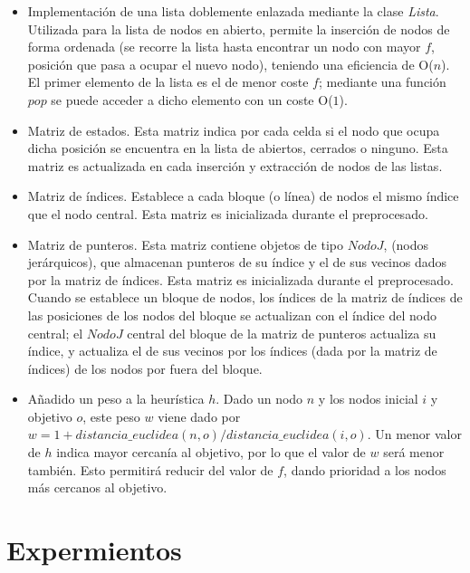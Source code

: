 \documentclass[11pt,spanish]{article} %
\begin{document}
\begin{itemize}
	\item Implementación de una lista doblemente enlazada mediante la clase \textit{Lista}. Utilizada para la lista de nodos en abierto, permite la inserción de nodos de forma ordenada (se recorre la lista hasta encontrar un nodo con mayor $f$, posición que pasa a ocupar el nuevo nodo), teniendo una eficiencia de O($n$). El primer elemento de la lista es el de menor coste $f$; mediante una función $pop$ se puede acceder a dicho elemento con un coste O($1$).
	
	\item Matriz de estados. Esta matriz indica por cada celda si el nodo que ocupa dicha posición se encuentra en la lista de abiertos, cerrados o ninguno. Esta matriz es actualizada en cada inserción y extracción de nodos de las listas.
	
	\item Matriz de índices. Establece a cada bloque (o línea) de nodos el mismo índice que el nodo central.	Esta matriz es inicializada durante el preprocesado.
	
	\item Matriz de punteros. Esta matriz contiene objetos de tipo $NodoJ$, (nodos jerárquicos), que almacenan punteros de su índice y el de sus vecinos dados por la matriz de índices. Esta matriz es inicializada durante el preprocesado. Cuando se establece un bloque de nodos, los índices de la matriz de índices de las posiciones de los nodos del bloque se actualizan con el índice del nodo central; el $NodoJ$ central del bloque de la matriz de punteros actualiza su índice, y actualiza el de sus vecinos por los índices (dada por la matriz de índices) de los nodos por fuera del bloque.

	\item Añadido un peso a la heurística $h$. Dado un nodo $n$ y los nodos inicial $i$ y objetivo $o$, este peso $w$ viene dado por $w = 1 + distancia\_euclidea(n, o) / distancia\_euclidea(i, o)$. Un menor valor de $h$ indica mayor cercanía al objetivo, por lo que el valor de $w$ será menor también. Esto permitirá reducir del valor de $f$, dando prioridad a los nodos más cercanos al objetivo.

\end{itemize}

\section{Expermientos}
\end{document}
